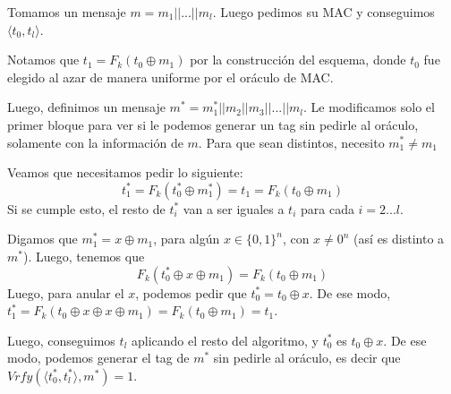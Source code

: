 \documentclass[12pt,addpoints,answers]{exam}
\begin{document}
\begin{questions}
\begin{parts}
\begin{solution}
      Tomamos un mensaje $m = m_1 || ... || m_l$. Luego pedimos su MAC y conseguimos $\langle t_0, t_l \rangle$.

      Notamos que $t_1 = F_k(t_0 \oplus m_1)$ por la construcción del esquema, donde $t_0$ fue elegido al azar de manera uniforme por el oráculo de MAC.

      Luego, definimos un mensaje $m^* = m_1^* || m_2 || m_3 || ... || m_l$. Le modificamos solo el primer bloque para ver si le podemos generar un tag sin pedirle al oráculo, solamente con la información de $m$. Para que sean distintos, necesito $m_1^* \neq m_1$

      Veamos que necesitamos pedir lo siguiente:
      $$t_1^* = F_k(t_0^* \oplus m_1^*) = t_1 = F_k(t_0 \oplus m_1)$$
      Si se cumple esto, el resto de $t_i^*$ van a ser iguales a $t_i$ para cada $i=2...l$.

      Digamos que $m_1^* = x \oplus m_1$, para algún $x \in \{0, 1\}^n$, con $x \neq 0^n$ (así es distinto a $m^*$). Luego, tenemos que $$F_k(t_0^* \oplus x \oplus m_1) = F_k(t_0 \oplus m_1)$$ 
      Luego, para anular el $x$, podemos pedir que $t_0^* = t_0 \oplus x$.
      De ese modo, $t_1^* = F_k(t_0 \oplus x \oplus x \oplus m_1) = F_k(t_0 \oplus m_1) = t_1$.
      
      Luego, conseguimos $t_l$ aplicando el resto del algoritmo, y $t_0^*$ es $t_0 \oplus x$. De ese modo, podemos generar el tag de $m^*$ sin pedirle al oráculo, es decir que $Vrfy(\langle t_0^*, t_l^* \rangle, m^*) = 1$.

      
    \end{solution}
\end{parts}


\question
{}
\end{questions}
\end{document}

